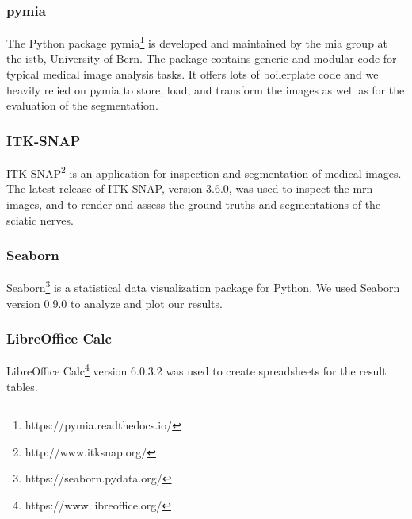 \subsubsection{pymia}
The Python package pymia\footnote{https://pymia.readthedocs.io/} is developed and maintained by the \gls{mia} group at the \gls{istb}, University of Bern. The package contains generic and modular code for typical medical image analysis tasks. It offers lots of boilerplate code and we heavily relied on pymia to store, load, and transform the images as well as for the evaluation of the segmentation.
\subsubsection{ITK-SNAP}
ITK-SNAP\footnote{http://www.itksnap.org/} \cite{py06nimg} is an application for inspection and segmentation of medical images. The latest release of ITK-SNAP, version 3.6.0, was used to inspect the \gls{mrn} images, and to render and assess the ground truths and segmentations of the sciatic nerves.
\subsubsection{Seaborn}
Seaborn\footnote{https://seaborn.pydata.org/} is a statistical data visualization package for Python. We used Seaborn version 0.9.0 to analyze and plot our results.
\subsubsection{LibreOffice Calc}
LibreOffice Calc\footnote{https://www.libreoffice.org/} version 6.0.3.2 was used to create spreadsheets for the result tables.

